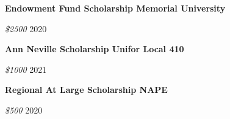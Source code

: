 \textbf{Endowment Fund Scholarship \hfill Memorial University} \par
\textit{\$2500} \hfill 2020 \par
\textbf{Ann Neville Scholarship \hfill Unifor Local 410} \par
\textit{\$1000} \hfill 2021 \par
\textbf{Regional At Large Scholarship \hfill NAPE} \par
\textit{\$500} \hfill 2020 \par
